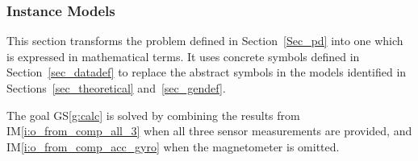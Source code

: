 \documentclass[12pt]{article}
\newcommand{\colAwidth}{0.13\textwidth}
\newcommand{\colBwidth}{0.82\textwidth}
\newcommand{\gsref}[1]{GS\ref{#1}} \newcounter{instnum} %
\newcommand{\iref}[1]{IM\ref{#1}} \newcounter{reqnum} %
\begin{document}



\subsubsection{Instance Models} \label{sec_instance}


This section transforms the problem defined in Section~\ref{Sec_pd} into one which is expressed in
mathematical terms. It uses concrete symbols defined in Section~\ref{sec_datadef} to replace the
abstract symbols in the models identified in Sections~\ref{sec_theoretical} and~\ref{sec_gendef}.

The goal \gsref{g:calc} is solved by combining the results from \iref{i:o_from_comp_all_3} when all
three sensor measurements are provided, and \iref{i:o_from_comp_acc_gyro} when the magnetometer is
omitted. 
\end{document}
